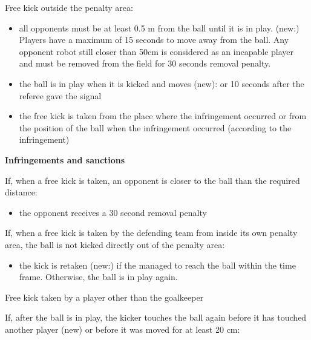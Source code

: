 \bigskip

Free kick outside the penalty area:

\begin{itemize}
\item all opponents must be at least 0.5 m from the ball until it is in play. (new:) Players have a maximum of 15 seconds to move away from the ball. Any opponent robot still closer than 50cm is considered as an incapable player and must be removed from the field for 30 seconds removal penalty.
\item the ball is in play when it is kicked and moves (new): or 10 seconds after the referee gave the signal
\item the free kick is taken from the place where the infringement occurred or from the position of the ball when the infringement occurred (according to the infringement)
\end{itemize}

\bigskip

{\bfseries Infringements and sanctions}

\headlinebox

If, when a free kick is taken, an opponent is closer to the ball than the required distance:

\begin{itemize}
\item the opponent receives a 30 second removal penalty 
\end{itemize}

If, when a free kick is taken by the defending team from inside its own penalty area, the ball is not kicked directly out of the penalty area:


\begin{itemize}
\item the kick is retaken (new:) if the   managed to reach the ball within the time frame. Otherwise, the ball is in play again.
\end{itemize}

\bigskip

Free kick taken by a player other than the goalkeeper

If, after the ball is in play, the kicker touches the ball again  before it has touched another player (new) or before it was moved for at least 20 cm:

